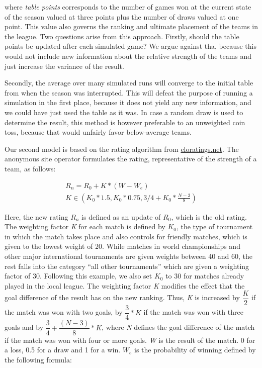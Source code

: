 \documentclass[12pt,a4paper]{article}
\begin{document}
where \emph{table points} corresponds to the number of games won at the
current state of the season valued at three points plus the number of
draws valued at one point. This value also governs the ranking and
ultimate placement of the teams in the league. Two questions arise from
this approach. Firstly, should the table points be updated after each
simulated game? We argue against tha, because this would not include new
information about the relative strength of the teams and just increase
the variance of the result.

Secondly, the average over many simulated runs will converge to the
initial table from when the season was interrupted. This will defeat the
purpose of running a simulation in the first place, because it does not
yield any new information, and we could have just used the table as it
was. In case a random draw is used to determine the result, this method
is however preferable to an unweighted coin toss, because that would
unfairly favor below-average teams.

Our second model is based on the rating algorithm from
\href{eloratings.net/about}{eloratings.net}. The anonymous site operator
formulates the rating, representative of the strength of a team, as
follows:

\begin{gather}
R_n = R_0 + K * (W - W_e)\\
K \in \left( K_0 * 1.5, K_0 * 0.75, 3/4 + K_0 * \frac{N-3}{8} \right)
\end{gather}

Here, the new rating \(R_n\) is defined as an update of \(R_0\), which
is the old rating. The weighting factor \emph{K} for each match is
defined by \(K_0\), the type of tournament in which the match takes
place and also controls for friendly matches, which is given to the
lowest weight of 20. While matches in world championships and other
major international tournaments are given weights between 40 and 60, the
rest falls into the category \enquote{all other tournaments} which are
given a weighting factor of 30. Following this example, we also set
\(K_0\) to 30 for matches already played in the local league. The
weighting factor \emph{K} modifies the effect that the goal difference
of the result has on the new ranking. Thus, \emph{K} is increased by
\(\dfrac{K}{2}\) if the match was won with two goals, by
\(\dfrac{3}{4}* K\) if the match was won with three goals and by
\(\dfrac{3}{4} + \dfrac{(N-3)}{8} * K\), where \emph{N} defines the goal
difference of the match if the match was won with four or more goals.
\emph{W} is the result of the match. 0 for a loss, 0.5 for a draw and 1
for a win. \(W_e\) is the probability of winning defined by the
following formula:
\end{document}
